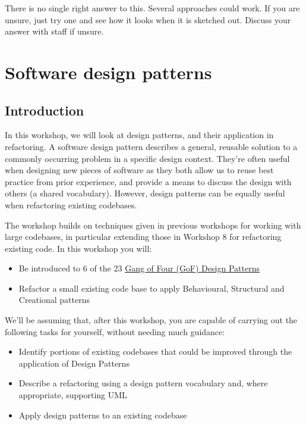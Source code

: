 \documentclass[
]{book}
\providecommand{\tightlist}{%
  \setlength{\itemsep}{0pt}\setlength{\parskip}{0pt}}
\begin{document}
There is no single right answer to this. Several approaches could work. If you are unsure, just try one and see how it looks when it is sketched out. Discuss your answer with staff if unsure.

\hypertarget{patterning}{%
\chapter{Software design patterns}\label{patterning}}

\hypertarget{introduction}{%
\section{Introduction}\label{introduction}}

In this workshop, we will look at design patterns, and their application in refactoring. A software design pattern describes a general, reusable solution to a commonly occurring problem in a specific design context. They're often useful when designing new pieces of software as they both allow us to reuse best practice from prior experience, and provide a means to discuss the design with others (a shared vocabulary). However, design patterns can be equally useful when refactoring existing codebases.

The workshop builds on techniques given in previous workshops for working with large codebases, in particular extending those in Workshop 8 for refactoring existing code. In this workshop you will:

\begin{itemize}
\tightlist
\item
  Be introduced to 6 of the 23 \href{https://en.wikipedia.org/wiki/Design_Patterns}{Gang of Four (GoF) Design Patterns} \citep{GoF}
\item
  Refactor a small existing code base to apply Behavioural, Structural and Creational patterns
\end{itemize}

We'll be assuming that, after this workshop, you are capable of carrying out the following tasks for yourself, without needing much guidance:

\begin{itemize}
\tightlist
\item
  Identify portions of existing codebases that could be improved through the application of Design Patterns
\item
  Describe a refactoring using a design pattern vocabulary and, where appropriate, supporting UML
\item
  Apply design patterns to an existing codebase
\end{itemize}
\end{document}
